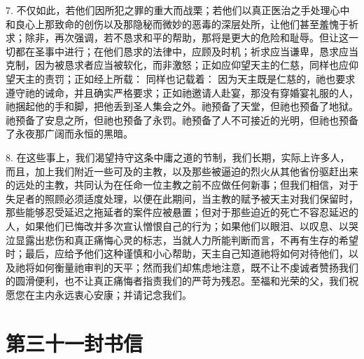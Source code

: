 7. 不仅如此，若他们因所犯之罪的重大而战栗；若他们以真正医治之手处理心中和良心上那致命的创伤以及那隐秘而微妙的恶毒的深层处所，让他们甚至羞愧于祈求；除非，再次强调，若不恳求和平的帮助，那将是更大的危险和耻辱。但让这一切都在圣事中进行；在他们恳求的法律中，应顾及时机；祈求应当谦卑，恳求应当克制，因为被恳求者应当被软化，而非激怒；正如应仰望天主的仁慈，同样也应仰望天主的责罚；正如经上所载：  同样也记载着： 因为天主既是仁慈的，祂也要求遵守祂的诫命，并且确实严格要求；正如祂邀请人赴宴，那没有穿婚宴礼服的人，祂捆起他的手和脚，把他丢到圣人集会之外。祂预备了天堂，但祂也预备了地狱。祂预备了安息之所，但祂也预备了永罚。祂预备了人不可接近的光明，但祂也预备了永夜那广阔而永恒的黑暗。\par

8. 在这些事上，我们渴望持守这条中庸之道的节制，我们长期，实际上许多人，而且，加上我们附近一些可及的主教，以及那些被逼迫的烈火从其他省份驱赶出来的远处的主教，共同认为在任命一位主教之前不应做任何新事；但我们相信，对于失足者的照顾必须适度处理，以便在此期间，当主教的赋予被天主对我们保留时，那些能够忍受延迟之拖延者的案件应被悬置；但对于那些迫近的死亡不容忍延迟的人，如果他们已悔改并多次宣认憎恨自己的行为；如果他们以眼泪、以叹息、以哭泣显露出悲伤和真正痛悔心灵的标志，当就人力所能判断而言，不再有生存的希望时；最后，应给予他们这种谨慎和小心帮助，天主自己知道祂将如何对待他们，以及祂将如何衡量祂审判的天平；然而我们却焦虑地注意，既不让不虔诚者赞扬我们的圆滑便利，也不让真正痛悔者指责我们的严苛为残忍。至福和光荣的父，我们祝愿您在主内永远衷心安康；并请记念我们。\par



\section{第三十一封书信}

\par

\par

